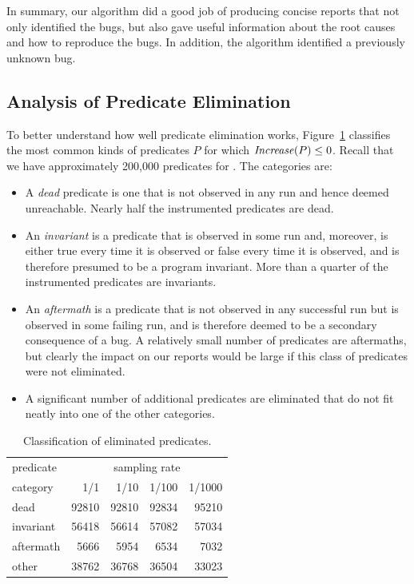 In summary, our algorithm did a good job of producing concise reports that not
only identified the bugs, but also gave useful information about the root causes and
how to reproduce the bugs.  In addition, the algorithm identified a previously unknown
bug.

\subsection{Analysis of Predicate Elimination}

To better understand how well predicate elimination works,
Figure~\ref{predelim} classifies the most common kinds of predicates
$P$ for which $\mbox{\textit{Increase}}(P) \leq 0$.  Recall that we have
approximately 200,000 predicates for \moss.  The categories are:

\begin{itemize}
\item  A {\it dead} predicate is one that is not observed in any run and hence
deemed unreachable.  Nearly half the instrumented predicates are dead.

\item An {\it invariant} is a predicate that is observed in some run and, moreover,
is either true every time it is observed or false every time it is observed,
and is therefore presumed to be a program invariant.  More than a quarter of
the instrumented predicates are invariants.

\item An {\it aftermath} is a predicate that is not observed in any successful run but
is observed in some failing run, and is therefore deemed to be a secondary consequence
of a bug.  A relatively small number of predicates are aftermaths, but clearly
the impact on our reports would be large if this class of predicates were not eliminated.

\item A significant number of additional predicates are eliminated that do not fit
neatly into one of the other categories.

\end{itemize}

\begin{table}
\centering
\caption{Classification of eliminated predicates.}
\vspace{\baselineskip}
\begin{tabular}{|l|r|r|r|r|}
\hline
predicate &  \multicolumn{4}{c|}{sampling rate} \\
\cline{2-5}
category  &  1/1 & 1/10 & 1/100 & 1/1000 \\
\hline
\hline
dead      &  92810 & 92810 & 92834 & 95210 \\
\hline
invariant &  56418 & 56614 & 57082 & 57034 \\
\hline
aftermath &  5666  & 5954  & 6534  & 7032 \\
\hline
other     &  38762 & 36768 & 36504 & 33023 \\
\hline
\end{tabular}
\label{predelim}
\end{table}

